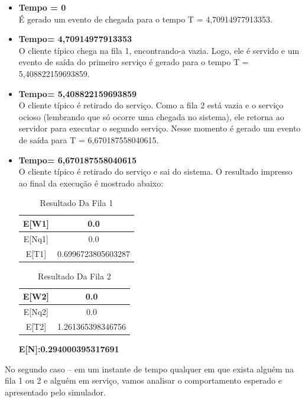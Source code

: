 \documentclass[a4paper,10pt]{article}
\begin{document}
      \begin{itemize}
	    \item \textbf{Tempo = 0\\}
	    É gerado um evento de chegada para o tempo T = 4,70914977913353.
	    \item \textbf{Tempo= 4,70914977913353\\}
	    O cliente típico chega na fila 1, encontrando-a vazia. Logo, ele é servido e um evento de saída do primeiro serviço é gerado para o tempo T = 5,408822159693859.
	    \item \textbf{Tempo= 5,408822159693859\\}
	    O cliente típico é retirado do serviço. Como a fila 2 está vazia e o serviço ocioso (lembrando que só ocorre uma chegada no sistema), ele retorna ao servidor para executar o segundo serviço. 
	    Nesse momento é gerado um evento de saída para T = 6,670187558040615.
	    \item \textbf{Tempo= 6,670187558040615\\}
	    O cliente típico é retirado do serviço e sai do sistema.
	    O resultado impresso ao final da execução é mostrado abaixo:
	    \begin{table}[H] 
		  \centering
		  \begin{tabular}{|c|c|}
		        \hline
			 E[W1] & 0.0              \\ \hline
			 E[Nq1]& 0.0              \\ \hline
			 E[T1] &0.6996723805603287\\ \hline
		  \end{tabular}
		  \caption{Resultado Da Fila 1} 
	    \end{table}
	    \begin{table}[H] 
		  \centering
		  \begin{tabular}{|c|c|}
		        \hline
			 E[W2] & 0.0              \\ \hline
			 E[Nq2]& 0.0              \\ \hline
			 E[T2] &1.261365398346756\\ \hline
		  \end{tabular}
		  \caption{Resultado Da Fila 2} 
	    \end{table}
	    \begin{center}\textbf{E[N]:0.294000395317691} \end{center}
      \end{itemize}
       No segundo caso – em um instante de tempo qualquer em que exista alguém na fila 1 ou 2 e alguém em serviço, vamos analisar o comportamento esperado e apresentado pelo simulador.
\end{document}
